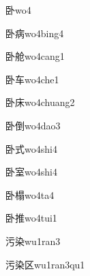 \begin{verbete}[8]{卧}{wo4}
\end{verbete}

\begin{verbete}[8;10]{卧病}{wo4bing4}
\end{verbete}

\begin{verbete}[8;10]{卧舱}{wo4cang1}
\end{verbete}

\begin{verbete}[8;4]{卧车}{wo4che1}
\end{verbete}

\begin{verbete}[8;7]{卧床}{wo4chuang2}
\end{verbete}

\begin{verbete}[8;10]{卧倒}{wo4dao3}
\end{verbete}

\begin{verbete}[8;6]{卧式}{wo4shi4}
\end{verbete}

\begin{verbete}[8;9]{卧室}{wo4shi4}
\end{verbete}

\begin{verbete}[8;14]{卧榻}{wo4ta4}
\end{verbete}

\begin{verbete}[8;11]{卧推}{wo4tui1}
\end{verbete}

\begin{verbete}[6;9]{污染}{wu1ran3}
\end{verbete}

\begin{verbete}[6;9;4]{污染区}{wu1ran3qu1}
\end{verbete}

